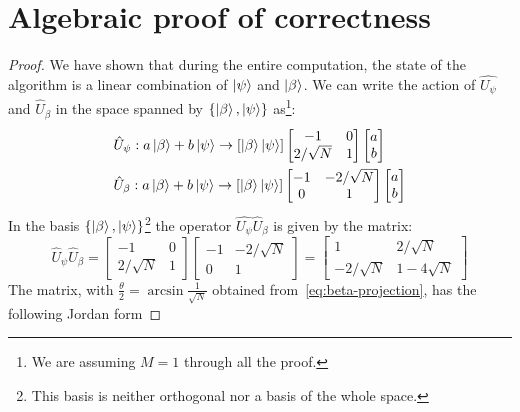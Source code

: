 \section{Algebraic proof of correctness}
\begin{proof}
We have shown that during the entire computation, the state of the algorithm is a linear combination of $\ket{\psi}$ and $\ket{\beta}$. We can write the action of $\hat{U_\psi}$ and $\hat{U}_\beta$ in the space spanned by $\{\ket{\beta}, \ket{\psi}\}$ as\footnote{We are assuming $M=1$ through all the proof.}:
\begin{align*}
    &\hat{U}_\psi : a\ket{\beta} + b\ket{\psi} \rightarrow [\ket{\beta}\ket{\psi}] \begin{bmatrix}
    -1 & 0 \\
    2/\sqrt{N} & 1
    \end{bmatrix} 
    \begin{bmatrix}
    a \\
    b
    \end{bmatrix} \\
    &\hat{U}_\beta : a\ket{\beta} + b\ket{\psi} \rightarrow [\ket{\beta}\ket{\psi}] \begin{bmatrix}
    -1 & -2/\sqrt{N} \\
    0 & 1
    \end{bmatrix} 
    \begin{bmatrix}
    a \\
    b
    \end{bmatrix} 
\end{align*}
In the basis $\{\ket{\beta}, \ket{\psi}\}$\footnote{This basis is neither orthogonal nor a basis of the whole space.} the operator $\hat{U_\psi}\hat{U}_\beta$ is given by the matrix:
\begin{equation*}
    \hat{U}_\psi\hat{U}_\beta = \begin{bmatrix}
    -1 & 0 \\
    2/\sqrt{N} & 1
    \end{bmatrix} 
    \begin{bmatrix}
    -1 & -2/\sqrt{N} \\
    0 & 1
    \end{bmatrix}  =
    \begin{bmatrix}
    1 & 2/\sqrt{N} \\
    -2/\sqrt{N} & 1-4\sqrt{N}
    \end{bmatrix} 
\end{equation*}
The matrix, with $\frac{\theta}{2} = \arcsin{\frac{1}{\sqrt{N}}}$ obtained from~\ref{eq:beta-projection}, has the following Jordan form

\end{proof}
